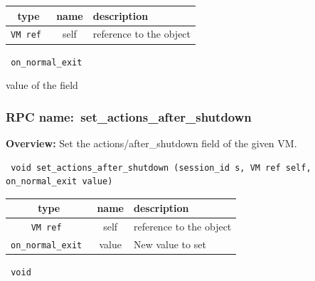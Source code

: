 
 
\vspace{0.3cm}
\begin{tabular}{|c|c|p{7cm}|}
 \hline
{\bf type} & {\bf name} & {\bf description} \\ \hline
{\tt VM ref } & self & reference to the object \\ \hline 

\end{tabular}

\vspace{0.3cm}

{\tt 
on\_normal\_exit
}


value of the field
\vspace{0.3cm}
\vspace{0.3cm}
\vspace{0.3cm}
\subsubsection{RPC name:~set\_actions\_after\_shutdown}

{\bf Overview:} 
Set the actions/after\_shutdown field of the given VM.

\begin{verbatim} void set_actions_after_shutdown (session_id s, VM ref self, on_normal_exit value)\end{verbatim}



 
\vspace{0.3cm}
\begin{tabular}{|c|c|p{7cm}|}
 \hline
{\bf type} & {\bf name} & {\bf description} \\ \hline
{\tt VM ref } & self & reference to the object \\ \hline 

{\tt on\_normal\_exit } & value & New value to set \\ \hline 

\end{tabular}

\vspace{0.3cm}

{\tt 
void
}



\vspace{0.3cm}
\vspace{0.3cm}
\vspace{0.3cm}
